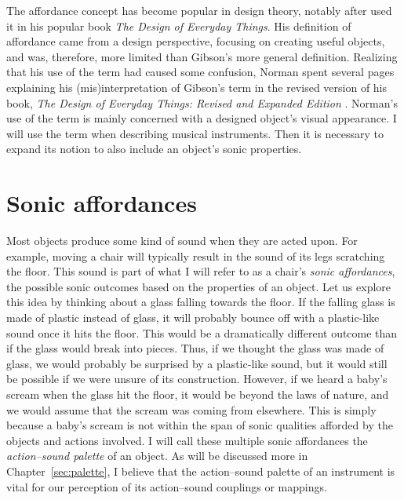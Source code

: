 The affordance concept has become popular in design theory, notably after \citet{norman_design_1988} used it in his popular book \emph{The Design of Everyday Things}. His definition of affordance came from a design perspective, focusing on creating useful objects, and was, therefore, more limited than Gibson's more general definition. Realizing that his use of the term had caused some confusion, Norman spent several pages explaining his (mis)interpretation of Gibson's term in the revised version of his book, \emph{The Design of Everyday Things: Revised and Expanded Edition} \citep{norman_design_2013}.  Norman's use of the term is mainly concerned with a designed object's visual appearance. I will use the term when describing musical instruments. Then it is necessary to expand its notion to also include an object's sonic properties.


\section{Sonic affordances}\label{sec:sonic-affordances}

Most objects produce some kind of sound when they are acted upon. For example, moving a chair will typically result in the sound of its legs scratching the floor. This sound is part of what I will refer to as a chair's \emph{sonic affordances}, the possible sonic outcomes based on the properties of an object. Let us explore this idea by thinking about a glass falling towards the floor. If the falling glass is made of plastic instead of glass, it will probably bounce off with a plastic-like sound once it hits the floor. This would be a dramatically different outcome than if the glass would break into pieces. Thus, if we thought the glass was made of glass, we would probably be surprised by a plastic-like sound, but it would still be possible if we were unsure of its construction. However, if we heard a baby's scream when the glass hit the floor, it would be beyond the laws of nature, and we would assume that the scream was coming from elsewhere. This is simply because a baby's scream is not within the span of sonic qualities afforded by the objects and actions involved. I will call these multiple sonic affordances the \emph{action--sound palette} of an object. As will be discussed more in Chapter~\ref{sec:palette}, I believe that the action--sound palette of an instrument is vital for our perception of its action--sound couplings or mappings.

